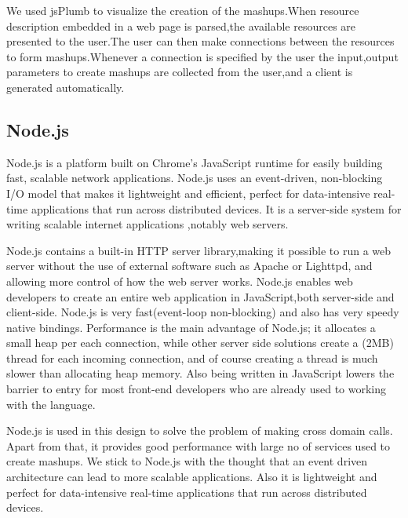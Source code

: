 \begin{spacing}{1.5}
We used jsPlumb to visualize the creation of the mashups.When resource description embedded in a web page is parsed,the available resources are presented to the user.The user can then make connections between the resources to form mashups.Whenever a connection is specified by the user the input,output parameters to create mashups are collected from the user,and a client is generated automatically.

\subsection{Node.js}
Node.js is a platform built on Chrome's JavaScript runtime for easily building fast, scalable network applications. Node.js uses an event-driven, non-blocking I/O model that makes it lightweight and efficient, perfect for data-intensive real-time applications that run across distributed devices. It is a server-side system for writing scalable internet applications ,notably web servers.

Node.js contains a built-in HTTP  server library\cite{nodejs},making it possible to run a web server without the use of external software such as Apache or Lighttpd, and allowing more control of how the web server works. Node.js enables web developers to create an entire web application in JavaScript,both server-side and client-side. Node.js is very fast(event-loop non-blocking) and also has very speedy native bindings. Performance is the main advantage of Node.js; it allocates a small heap per each connection, while other server side solutions create a (2MB) thread for each incoming connection, and of course creating a thread is much slower than allocating heap memory. Also being written in JavaScript lowers the barrier to entry for most front-end developers who are already used to working with the language.

Node.js is used in this design to solve the problem of making cross domain calls. Apart from that, it provides good performance with large  no of services used to create mashups. We stick to Node.js with the  thought  that an event driven architecture can lead to more scalable applications. Also it is lightweight and  perfect for data-intensive real-time applications that run across distributed devices.


\end{spacing}

